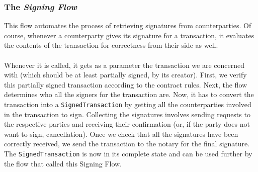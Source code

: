\documentclass[12pt,twoside]{article}
\begin{document}
\subsubsection{The \textit{Signing Flow}}
\label{sub:signtr}
This flow automates the process of retrieving signatures from counterparties. Of course, whenever a counterparty gives its signature for a transaction, it evaluates the contents of the transaction for correctness from their side as well.
\\ \\
Whenever it is called, it gets as a parameter the transaction we are concerned with (which should be at least partially signed, by its creator). First, we verify this partially signed transaction according to the contract rules. Next, the flow determines who all the signers for the transaction are. Now, it has to convert the transaction into a \verb|SignedTransaction| by getting all the counterparties involved in the transaction to sign. Collecting the signatures involves sending requests to the respective parties and receiving their confirmation (or, if the party does not want to sign, cancellation). Once we check that all the signatures have been correctly received, we send the transaction to the notary for the final signature. The \verb|SignedTransaction| is now in its complete state and can be used further by the flow that called this Signing Flow.
\end{document}
